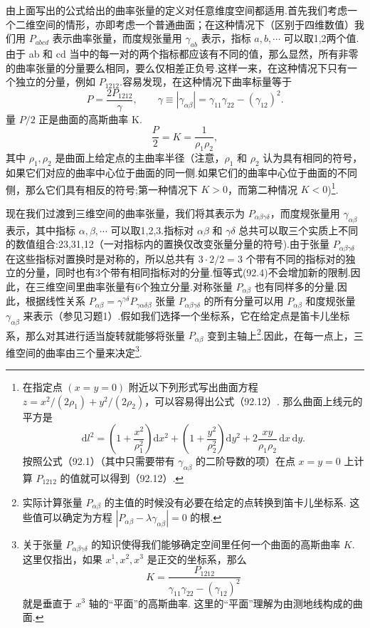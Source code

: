 由上面写出的公式给出的曲率张量的定义对任意维度空间都适用.首先我们考虑一个二维空间的情形，亦即考虑一个普通曲面；在这种情况下（区别于四维数值）我们用 $P_{abcd}$ 表示曲率张量，而度规张量用 $\gamma_{ab}$ 表示，指标 $a,b,\cdots$ 可以取1,2两个值.由于 ab 和 cd 当中的每一对的两个指标都应该有不同的值，那么显然，所有非零的曲率张量的分量要么相同，要么仅相差正负号.这样一来，在这种情况下只有一个独立的分量，例如 $P_{1212}$.容易发现，在这种情况下曲率标量等于
\begin{equation}
  P=\frac{2P_{1212}}{\gamma},\qquad
  \gamma\equiv|\gamma_{\alpha\beta}|
  =\gamma_{11}\gamma_{22}-(\gamma_{12})^2.
\end{equation}
量 $P/2$ 正是曲面的高斯曲率 K.
\begin{equation}
  \frac{P}{2}=K=\frac{1}{\rho_1\rho_2},
\end{equation}
其中 $\rho_1,\rho_2$ 是曲面上给定点的主曲率半径（注意，$\rho_1$ 和 $\rho_2$ 认为具有相同的符号，如果它们对应的曲率中心位于曲面的同一侧.如果它们的曲率中心位于曲面的不同侧，那么它们具有相反的符号;第一种情况下 $K>0$，而第二种情况 $K<0$)\footnote{在指定点 $(x=y=0)$ 附近以下列形式写出曲面方程 $z=x^2/(2\rho_1)+y^2/(2\rho_2)$，可以容易得出公式（92.12）. 那么曲面上线元的平方是
\begin{equation*}
  \mathrm{d}l^2=\left(1+\frac{x^2}{\rho_1^2}\right)\mathrm{d}x^2
  +\left(1+\frac{y^2}{\rho_2^2}\right)\mathrm{d}y^2
  +2\frac{xy}{\rho_1\rho_2}\,\mathrm{d}x\,\mathrm{d}y.
\end{equation*}
按照公式（92.1）（其中只需要带有 $\gamma_{\alpha\beta}$ 的二阶导数的项）在点 $x=y=0$ 上计算 $P_{1212}$ 的值就可以得到（92.12）.}.

现在我们过渡到三维空间的曲率张量，我们将其表示为 $P_{\alpha\beta\gamma\delta}$，而度规张量用 $\gamma_{\alpha\beta}$ 表示，其中指标 $\alpha,\beta,\cdots$ 可以取1,2,3.指标对 $\alpha\beta$ 和 $\gamma\delta$ 总共可以取三个实质上不同的数值组合:23,31,12（一对指标内的置换仅改变张量分量的符号).由于张量 $P_{\alpha\beta\gamma\delta}$ 在这些指标对置换时是对称的，所以总共有 $3\cdot2/2=3$ 个带有不同的指标对的独立的分量，同时也有3个带有相同指标对的分量.恒等式(92.4)不会增加新的限制.因此，在三维空间里曲率张量有6个独立分量.对称张量 $P_{\alpha\beta}$ 也有同样多的分量.因此，根据线性关系 $P_{\alpha\beta}=\gamma^{\gamma\delta}P_{\gamma\alpha\delta\beta}$ 张量 $P_{\alpha\beta\gamma\delta}$ 的所有分量可以用 $P_{\alpha\beta}$ 和度规张量 $\gamma_{\alpha\beta}$ 来表示（参见习题1）.假如我们选择一个坐标系，它在给定点是笛卡儿坐标系，那么对其进行适当旋转就能够将张量 $P_{\alpha\beta}$ 变到主轴上\footnote{实际计算张量 $P_{\alpha\beta}$ 的主值的时候没有必要在给定的点转换到笛卡儿坐标系. 这些值可以确定为方程 $|P_{\alpha\beta}-\lambda\gamma_{\alpha\beta}|=0$ 的根.}.因此，在每一点上，三维空间的曲率由三个量来决定\footnote{关于张量 $P_{\alpha\beta\gamma\delta}$ 的知识使得我们能够确定空间里任何一个曲面的高斯曲率 $K$. 这里仅指出，如果 $x^1,x^2,x^3$ 是正交的坐标系，那么
\begin{equation*}
  K=\frac{P_{1212}}{\gamma_{11}\gamma_{22}-(\gamma_{12})^2}
\end{equation*}
就是垂直于 $x^3$ 轴的“平面”的高斯曲率. 这里的“平面”理解为由测地线构成的曲面.}.

